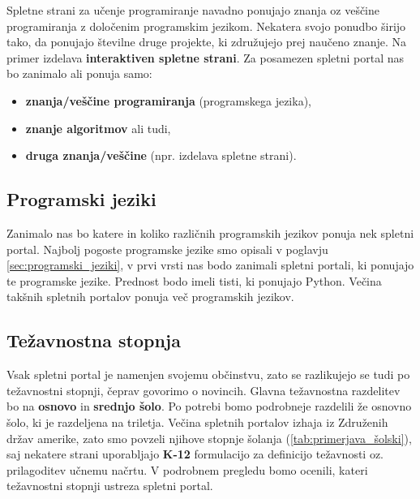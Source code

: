 Spletne strani za učenje programiranje navadno ponujajo znanja oz
veščine programiranja z določenim programskim jezikom. Nekatera svojo
ponudbo širijo tako, da ponujajo številne druge projekte, ki
združujejo prej naučeno znanje. Na primer izdelava
\textbf{interaktiven spletne strani}. Za posamezen spletni portal nas
bo zanimalo ali ponuja samo:

\begin{itemize}
  \tightlist
\item \textbf{znanja/veščine programiranja} (programskega jezika),
\item \textbf{znanje algoritmov} ali tudi,
\item \textbf{druga znanja/veščine} (npr. izdelava spletne strani).
\end{itemize}


\subsection{Programski jeziki}
\label{sec:_zanaja_programski_jeziki}

Zanimalo nas bo katere in koliko različnih programskih jezikov ponuja
nek spletni portal. Najbolj pogoste programske jezike smo opisali v
poglavju \ref{sec:programski_jeziki}, v prvi vrsti nas bodo zanimali
spletni portali, ki ponujajo te programske jezike. Prednost bodo imeli
tisti, ki ponujajo Python. Večina takšnih spletnih portalov ponuja več
programskih jezikov.

\subsection{Težavnostna stopnja}
\label{sec:težavnostna_stopnja}

Vsak spletni portal je namenjen svojemu občinstvu, zato se razlikujejo
se tudi po težavnostni stopnji, čeprav govorimo o novincih. Glavna
težavnostna razdelitev bo na \textbf{osnovo} in \textbf{srednjo
  šolo}. Po potrebi bomo podrobneje razdelili že osnovno šolo, ki je
razdeljena na triletja. Večina spletnih portalov izhaja iz Združenih
držav amerike, zato smo povzeli njihove stopnje šolanja
(\ref{tab:primerjava_šolski}), saj nekatere strani uporabljajo
\textbf{K-12} formulacijo za definicijo težavnosti oz. prilagoditev
učnemu načrtu. V podrobnem pregledu bomo ocenili, kateri težavnostni
stopnji ustreza spletni portal.

